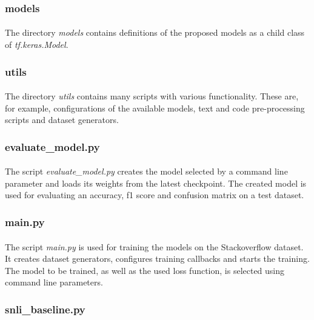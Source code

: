 \subsubsection{models}
\paragraph{}
The directory \textit{models} contains definitions of the proposed models as a child class of \textit{tf.keras.Model}.

\subsubsection{utils}
\paragraph{}
The directory \textit{utils} contains many scripts with various  functionality. These are, for example, configurations of the available models, text and code pre-processing scripts and dataset generators.

\subsubsection{evaluate\_model.py}
\paragraph{}
The script \textit{evaluate\_model.py} creates the model selected by a command line parameter and loads its weights from the latest checkpoint. The created model is used for evaluating an accuracy, f1 score and confusion matrix on a test dataset.

\subsubsection{main.py}
\paragraph{}
The script \textit{main.py} is used for training the models on the Stackoverflow dataset. It creates dataset generators, configures training callbacks and starts the training. The model to be trained, as well as the used loss function, is selected using command line parameters.

\subsubsection{snli\_baseline.py}
